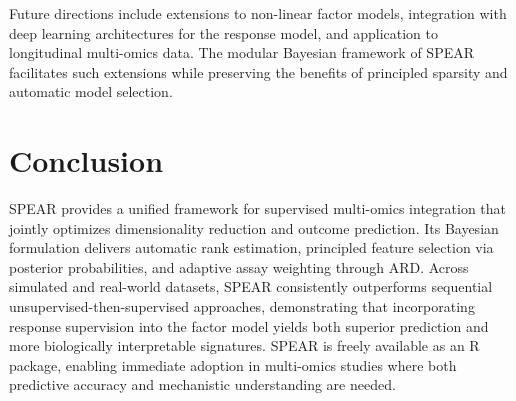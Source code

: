 \documentclass[11pt]{article}
\begin{document}
Future directions include extensions to non-linear factor models, integration with deep learning architectures for the response model, and application to longitudinal multi-omics data. The modular Bayesian framework of SPEAR facilitates such extensions while preserving the benefits of principled sparsity and automatic model selection.

\section{Conclusion}

SPEAR provides a unified framework for supervised multi-omics integration that jointly optimizes dimensionality reduction and outcome prediction. Its Bayesian formulation delivers automatic rank estimation, principled feature selection via posterior probabilities, and adaptive assay weighting through ARD. Across simulated and real-world datasets, SPEAR consistently outperforms sequential unsupervised-then-supervised approaches, demonstrating that incorporating response supervision into the factor model yields both superior prediction and more biologically interpretable signatures. SPEAR is freely available as an R package, enabling immediate adoption in multi-omics studies where both predictive accuracy and mechanistic understanding are needed.



\end{document}
